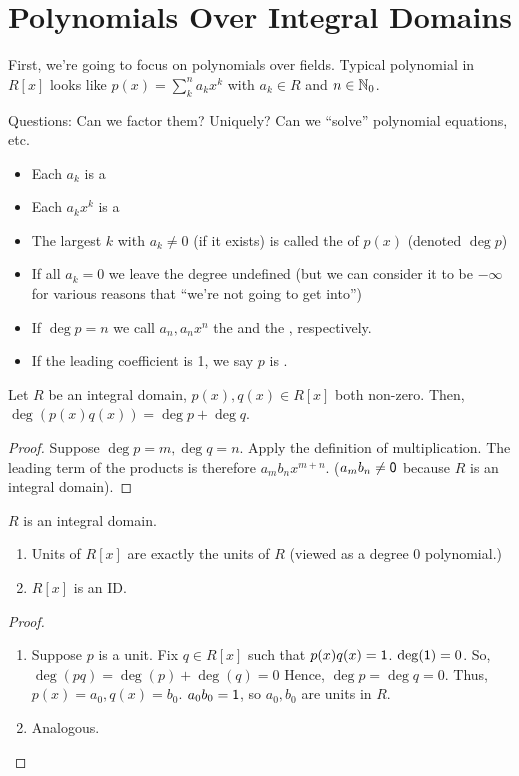\documentclass[notes.tex]{subfiles}
\begin{document}
\chapter{Polynomials Over Integral Domains}
First, we're going to focus on polynomials over fields.
Typical polynomial in $R[x]$ looks like $p(x) = \sum_k^na_kx^k$ with $a_k\in R$ and $n\in \mathbb{N}_0$.

Questions: Can we factor them? Uniquely? Can we ``solve'' polynomial equations, etc.

\begin{defn}\leavevmode
	\begin{itemize}
		\item Each $a_k$ is a 
		\item Each $a_kx^k$ is a 
		\item The largest $k$ with $a_k\ne0$ (if it exists) is called the  of $p(x)$ (denoted $\deg p$)
		\item If all $a_k = 0$ we leave the degree undefined (but we can consider it to be $-\infty$ for various reasons that ``we're not going to get into'')
		\item If $\deg p = n$ we call $a_n, a_nx^n$ the  and the , respectively.
		\item If the leading coefficient is 1, we say $p$ is .
	\end{itemize}
\end{defn}

\begin{proposition}
	Let $R$ be an integral domain, $p(x), q(x)\in R[x]$ both non-zero. Then, $\deg(p(x)q(x)) = \deg p + \deg q$.
\end{proposition}
\begin{proof}
	Suppose $\deg p = m, \deg q = n$. Apply the definition of multiplication.
	The leading term of the products is therefore $a_mb_nx^{m+n}$. ($a_mb_n\ne \mathsf{0}$ because $R$ is an integral domain).
\end{proof}

\begin{corollary}
	$R$ is an integral domain.
	\begin{enumerate}
		\item Units of $R[x]$ are exactly the units of $R$ (viewed as a degree 0 polynomial.)
		\item $R[x]$ is an ID.
	\end{enumerate}
\end{corollary}
\begin{proof}\leavevmode
	\begin{enumerate}
		\item Suppose $p$ is a unit. Fix $q\in R[x]$ such that $p(x)q(x) = \mathsf{1}$. $\deg(\mathsf{1}) = 0$. So, $\deg(pq) = \deg(p) + \deg(q) = 0$
		Hence, $\deg p = \deg q = 0.$ Thus, $p(x) = a_0, q(x) = b_0$. $a_0b_0 = \mathsf{1}$, so $a_0, b_0$ are units in $R$.
		\item Analogous.
	\end{enumerate}
\end{proof}
\end{document}
